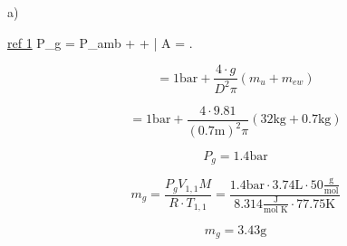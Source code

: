 a) 

\underline{ref 1} \quad P_g = P_{amb} +  +  \quad \left| A =  \right.

\[
= 1 \text{bar} + \frac{4 \cdot g}{D^2 \pi} (m_u + m_{ew})
\]

\[
= 1 \text{bar} + \frac{4 \cdot 9.81}{(0.7 \text{m})^2 \pi} \left(32 \text{kg} + 0.7 \text{kg}\right)
\]

\[
P_g = \boxed{1.4 \text{bar}}
\]

\[
m_g = \frac{P_g V_{1,1} M}{R \cdot T_{1,1}} = \frac{1.4 \text{bar} \cdot 3.74 \text{L} \cdot 50 \frac{\text{g}}{\text{mol}}}{8.314 \frac{\text{J}}{\text{mol K}} \cdot 77.75 \text{K}}
\]

\[
m_g = \boxed{3.43 \text{g}}
\]